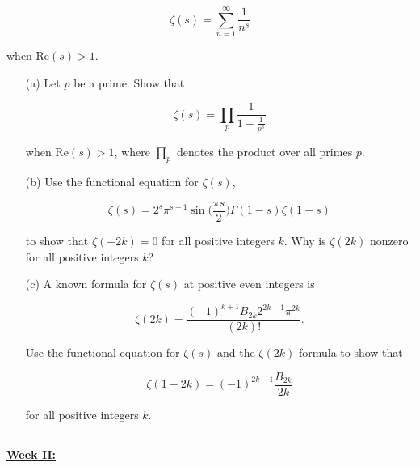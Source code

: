 \documentclass[12pt]{amsart}
\theoremstyle{definition}
\theoremstyle{remark}
\numberwithin{equation}{section}
\begin{document}
\begin{itemize}
$$\zeta(s) = \sum_{n=1}^{\infty} \frac{1}{n^s}$$

when $\text{Re}(s) > 1$.

\vspace{4mm}

\begin{itemize}
    \item[(a)] Let $p$ be a prime. Show that 

    $$\zeta(s) = \prod_{p} \frac{1}{1 - \frac{1}{p^s}} $$

    when $\text{Re}(s) > 1$, where $\displaystyle \prod_{p}$ denotes the product over all primes $p$.

\vspace{4mm}

   \item[(b)] Use the functional equation for $\zeta(s)$,

   $$\zeta(s) = 2^{s}\pi^{s-1} \sin \bigg(\frac{\pi s}{2}\bigg) \Gamma(1-s)\zeta(1-s)$$

   to show that $\zeta(-2k) = 0$ for all positive integers $k$. Why is $\zeta(2k)$ nonzero for all positive integers $k$?

\vspace{4mm}

   \item[(c)] A known formula for $\zeta(s)$ at positive even integers is

   $$\zeta(2k) = \frac{(-1)^{k+1}B_{2k}2^{2k-1}\pi^{2k}}{(2k)!}.$$

   \vspace{4mm}

   Use the functional equation for $\zeta(s)$ and the $\zeta(2k)$ formula to show that

   $$\zeta(1-2k) = (-1)^{2k-1} \frac{B_{2k}}{2k}$$

   for all positive integers $k$.
\end{itemize}

\end{itemize}

\vspace{8mm}

\hrule{}

\vspace{8mm}

\begin{center}
\large\textbf{\underline{Week II:}}
\end{center}

\vspace{8mm}
\end{document}
